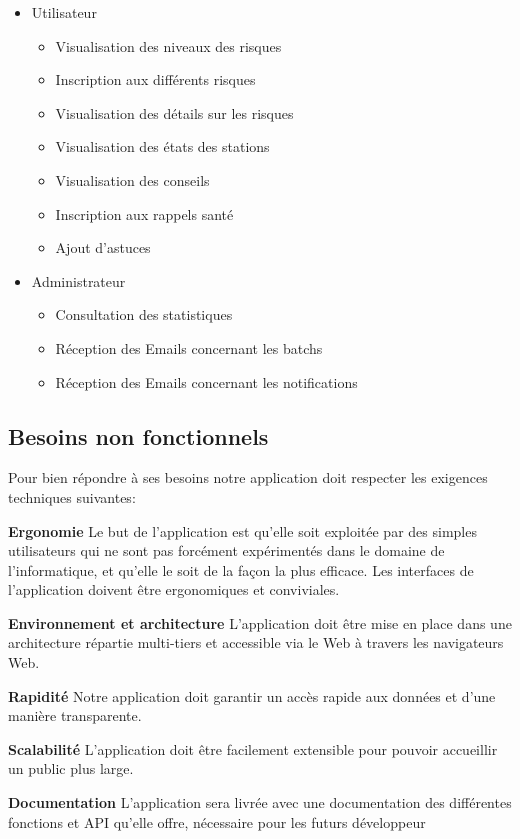\begin{itemize}
	\item Utilisateur
		\begin{itemize}
			\item Visualisation des niveaux des risques
			\item Inscription aux différents risques
			\item Visualisation des détails sur les risques
			\item Visualisation des états des stations
			\item Visualisation des conseils
			\item Inscription aux rappels santé
			\item Ajout d'astuces
		\end{itemize}
	\item Administrateur
		\begin{itemize}
			\item Consultation des statistiques
			\item Réception des Emails concernant les batchs
			\item Réception des Emails concernant les notifications
		\end{itemize}
\end{itemize}

\subsection{Besoins non fonctionnels}

\qquad Pour bien répondre à ses besoins notre application doit respecter les exigences techniques suivantes: 

\textbf{Ergonomie} Le but de l’application est qu’elle soit exploitée par des simples utilisateurs qui ne sont pas forcément expérimentés dans le domaine de l’informatique, et qu’elle le soit de la façon la plus efficace. Les interfaces de l’application doivent être ergonomiques et conviviales.

\textbf{Environnement et architecture} L’application doit être mise en place dans une architecture répartie multi-tiers et accessible via le Web à travers les navigateurs Web.

\textbf{Rapidité} Notre application doit garantir un accès rapide aux données et d’une manière transparente.

\textbf{Scalabilité} L’application doit être facilement extensible pour pouvoir accueillir un public plus large.

\textbf{Documentation} L’application sera livrée avec une documentation des différentes fonctions et API qu’elle offre, nécessaire pour les futurs développeur

